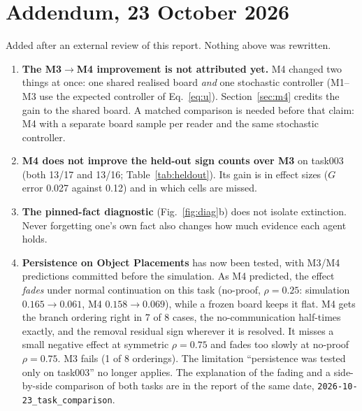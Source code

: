 \documentclass[10pt,a4paper]{article}
\begin{document}
\section*{Addendum, 23 October 2026}
Added after an external review of this report. Nothing above was rewritten.
\begin{enumerate}
\item \textbf{The M3$\to$M4 improvement is not attributed yet.} M4 changed two things at once: one shared realised
  board \emph{and} one stochastic controller (M1--M3 use the expected controller of Eq.~\eqref{eq:u}).
  Section~\ref{sec:m4} credits the gain to the shared board. A matched comparison is needed before that claim: M4 with
  a separate board sample per reader and the same stochastic controller.
\item \textbf{M4 does not improve the held-out sign counts over M3} on task003 (both 13/17 and 13/16;
  Table~\ref{tab:heldout}). Its gain is in effect sizes ($G$ error 0.027 against 0.12) and in which cells are missed.
\item \textbf{The pinned-fact diagnostic} (Fig.~\ref{fig:diag}b) does not isolate extinction. Never forgetting one's own
  fact also changes how much evidence each agent holds.
\item \textbf{Persistence on Object Placements} has now been tested, with M3/M4 predictions committed before the
  simulation. As M4 predicted, the effect \emph{fades} under normal continuation on this task (no-proof, $\rho=0.25$:
  simulation $0.165\to0.061$, M4 $0.158\to0.069$), while a frozen board keeps it flat. M4 gets the branch ordering right
  in 7 of 8 cases, the no-communication half-times exactly, and the removal residual sign wherever it is resolved. It
  misses a small negative effect at symmetric $\rho=0.75$ and fades too slowly at no-proof $\rho=0.75$. M3 fails (1 of 8
  orderings). The limitation ``persistence was tested only on task003'' no longer applies. The explanation of the fading
  and a side-by-side comparison of both tasks are in the report of the same date, \texttt{2026-10-23\_task\_comparison}.
\end{enumerate}
\end{document}
